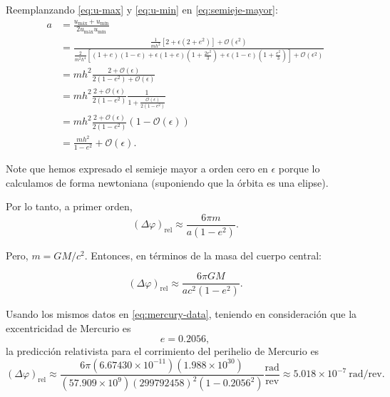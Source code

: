 \documentclass[letterpaper,11pt]{article}
\begin{document}
Reemplanzando \eqref{eq:u-max} y \eqref{eq:u-min} en \eqref{eq:semieje-mayor}:
\begin{align}
a &= \frac{u_{\text{máx}} + u_{\text{mín}}}{2 u_{\text{máx}} u_{\text{mín}}} \nonumber\\
&= \frac{\frac{1}{mh^2} \left[ 2 + \epsilon \left(2 + e^2 \right) \right] + \mathcal{O}(\epsilon^2)}{\frac{2}{m^2h^4} \left[(1+e)(1-e) + \epsilon (1+e) \left( 1 + \frac{2e^2}{3}\right) + \epsilon (1-e)\left(1  + \frac{e^2}{3}\right) \right]+ \mathcal{O}(\epsilon^2)}\nonumber \\
&= mh^2 \frac{2 + \mathcal{O}(\epsilon)}{2 (1-e^2) + \mathcal{O}(\epsilon)} \nonumber\\
&=  mh^2 \frac{2 + \mathcal{O}(\epsilon)}{2 (1-e^2)}  \frac{
1}{1 + \frac{\mathcal{O}(\epsilon)}{2(1-e^2)}} \nonumber\\
&= mh^2 \frac{2 + \mathcal{O}(\epsilon)}{2 (1-e^2)}   \left( 1 - \mathcal{O}(\epsilon) \right) \nonumber\\
&= \frac{mh^2}{1 - e^2} + \mathcal{O}(\epsilon).
\end{align}

Note que hemos expresado el semieje mayor a orden cero en $\epsilon$ porque lo calculamos de forma newtoniana (suponiendo que la órbita es una elipse).


Por lo tanto, a primer orden,
\begin{equation}
(\Delta \varphi)_{\text{rel}} \approx \frac{6\pi m}{a(1-e^2)}.
\end{equation}

Pero, $m = GM/c^2$. Entonces, en términos de la masa del cuerpo central:
\begin{shaded}
\begin{equation}
(\Delta \varphi)_{\text{rel}} \approx \frac{6\pi GM}{ac^2(1-e^2)}.
\end{equation}
\end{shaded}

Usando los mismos datos en \eqref{eq:mercury-data}, teniendo en consideración que la excentricidad de Mercurio es
\begin{equation}
e = 0.2056,
\end{equation}
la predicción relativista para el corrimiento del perihelio de Mercurio es 
\begin{equation}
(\Delta \varphi)_{\text{rel}} \approx \frac{6\pi (6.67430\times 10^{-11})(1.988 \times 10^{30})}{(57.909\times 10^{9})(299792458)^2(1 - 0.2056^2)} \frac{\text{rad}}{\text{rev}} \approx 5.018 \times 10^{-7} \ \text{rad}/\text{rev}. 
\end{equation}
\end{document}
